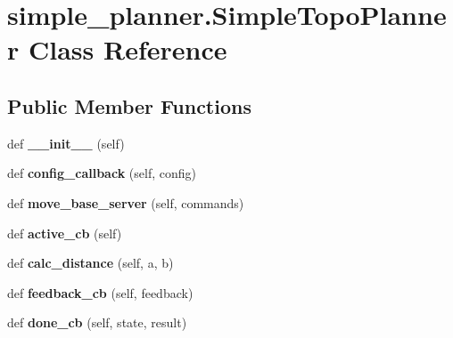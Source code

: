 \hypertarget{classsimple__planner_1_1SimpleTopoPlanner}{}\section{simple\+\_\+planner.\+Simple\+Topo\+Planner Class Reference}
\label{classsimple__planner_1_1SimpleTopoPlanner}
\subsection*{Public Member Functions}
\begin{DoxyCompactItemize}
\item 
\mbox{\label{classsimple__planner_1_1SimpleTopoPlanner_a8f8df723f15b7bf9854cd1f24fa0e98c}} 
def {\bfseries \+\_\+\+\_\+init\+\_\+\+\_\+} (self)
\item 
\mbox{\label{classsimple__planner_1_1SimpleTopoPlanner_a6e09684d02d3e12b8445096cec9fb503}} 
def {\bfseries config\+\_\+callback} (self, config)
\item 
\mbox{\label{classsimple__planner_1_1SimpleTopoPlanner_a18fc87b9186334ef3baab0a15123681f}} 
def {\bfseries move\+\_\+base\+\_\+server} (self, commands)
\item 
\mbox{\label{classsimple__planner_1_1SimpleTopoPlanner_a09581495fe3922f2d22f8f2d641cf5c1}} 
def {\bfseries active\+\_\+cb} (self)
\item 
\mbox{\label{classsimple__planner_1_1SimpleTopoPlanner_aadaa3e11e5d4ae5666cb35990cb63ad1}} 
def {\bfseries calc\+\_\+distance} (self, a, b)
\item 
\mbox{\label{classsimple__planner_1_1SimpleTopoPlanner_a71d0b7a0752a294d6609185e52c0e3a3}} 
def {\bfseries feedback\+\_\+cb} (self, feedback)
\item 
\mbox{\label{classsimple__planner_1_1SimpleTopoPlanner_acad6bb00f51997a7d7fc7f0fa7b6a168}} 
def {\bfseries done\+\_\+cb} (self, state, result)

\end{DoxyCompactItemize}
